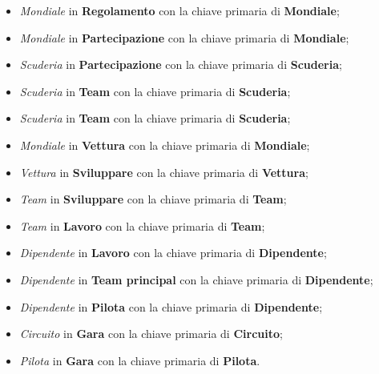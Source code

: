 \begin{itemize}
    \item \emph{Mondiale} in \textbf{Regolamento} con la chiave primaria di \textbf{Mondiale};
    \item \emph{Mondiale} in \textbf{Partecipazione} con la chiave primaria di \textbf{Mondiale};
    \item \emph{Scuderia} in \textbf{Partecipazione} con la chiave primaria di \textbf{Scuderia};
    \item \emph{Scuderia} in \textbf{Team} con la chiave primaria di \textbf{Scuderia};
    \item \emph{Scuderia} in \textbf{Team} con la chiave primaria di \textbf{Scuderia};
    \item \emph{Mondiale} in \textbf{Vettura} con la chiave primaria di \textbf{Mondiale};
    \item \emph{Vettura} in \textbf{Sviluppare} con la chiave primaria di \textbf{Vettura};
    \item \emph{Team} in \textbf{Sviluppare} con la chiave primaria di \textbf{Team};
    \item \emph{Team} in \textbf{Lavoro} con la chiave primaria di \textbf{Team};
    \item \emph{Dipendente} in \textbf{Lavoro} con la chiave primaria di \textbf{Dipendente};
    \item \emph{Dipendente} in \textbf{Team principal} con la chiave primaria di \textbf{Dipendente};
    \item \emph{Dipendente} in \textbf{Pilota} con la chiave primaria di \textbf{Dipendente};
    \item \emph{Circuito} in \textbf{Gara} con la chiave primaria di \textbf{Circuito};
    \item \emph{Pilota} in \textbf{Gara} con la chiave primaria di \textbf{Pilota}.
\end{itemize}